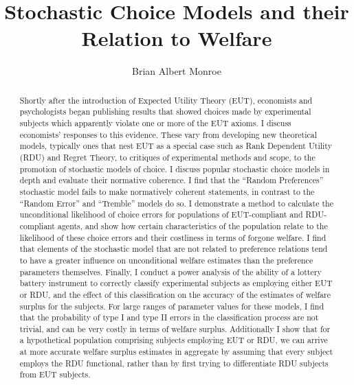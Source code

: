 \documentclass[11pt,a4paper,notitlepage]{report}
\title{Stochastic Choice Models and their Relation to Welfare}
\author{Brian Albert Monroe}
\begin{document}

\doublespacing

\begin{abstract}

Shortly after the introduction of Expected Utility Theory (EUT), economists and psychologists began publishing results that showed choices made by experimental subjects which apparently violate one or more of the EUT axioms.
I discuss economists' responses to this evidence.
These vary from developing new theoretical models, typically ones that nest EUT as a special case such as Rank Dependent Utility (RDU) and Regret Theory, to critiques of experimental methods and scope, to the promotion of stochastic models of choice.
I discuss popular stochastic choice models in depth and evaluate their normative coherence.
I find that the \enquote{Random Preferences} stochastic model fails to make normatively coherent statements, in contrast to the \enquote{Random Error} and \enquote{Tremble} models do so.
I demonstrate a method to calculate the unconditional likelihood of choice errors for populations of EUT-compliant and RDU-compliant agents, and show how certain characteristics of the population relate to the likelihood of these choice errors and their costliness in terms of forgone welfare.
I find that elements of the stochastic model that are not related to preference relations tend to have a greater influence on unconditional welfare estimates than the preference parameters themselves.
Finally, I conduct a power analysis of the ability of a lottery battery instrument to correctly classify experimental subjects as employing either EUT or RDU, and the effect of this classification on the accuracy of the estimates of welfare surplus for the subjects.
For large ranges of parameter values for these models, I find that the probability of type I and type II errors in the classification process are not trivial, and can be very costly in terms of welfare surplus.
Additionally I show that for a hypothetical population comprising subjects employing EUT or RDU, we can arrive at more accurate welfare surplus estimates in aggregate by assuming that every subject employs the RDU functional, rather than by first trying to differentiate RDU subjects from EUT subjects.

\end{abstract}
\end{document}
